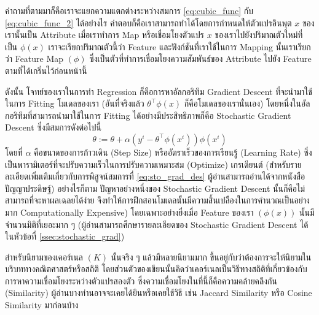 คำถามที่ตามมาก็คือเราจะแยกความแตกต่างระหว่างสมการ \eqref{eq:cubic_func} กับ \eqref{eq:cubic_func_2} ได้อย่างไร คำตอบก็คือเราสามารถทำได้โดยการกำหนดให้ตัวแปรอินพุต $x$ ของเรานั้นเป็น Attribute เมื่อเราทำการ Map หรือเชื่อมโยงตัวแปร $x$ ของเราไปยังปริมาณตัวใหม่ที่เป็น $\phi(x)$ เราจะเรียกปริมาณตัวนี้ว่า Feature และฟังก์ชันที่เราใช้ในการ Mapping นั้นเราเรียกว่า Feature Map $(\phi)$ ซึ่งเป็นตัวที่ทำการเชื่อมโยงความสัมพันธ์ของ Attribute ไปยัง Feature ตามที่ได้เกริ่นไว้ก่อนหน้านี้

ดังนั้น โจทย์ของเราในการทำ Regression ก็คือการหาอัลกอริทึม Gradient Descent ที่จะนำมาใช้ในการ Fitting โมเดลของเรา (อันที่จริงแล้ว $\theta^{\top}\phi(x)$ ก็คือโมเดลของเรานั่นเอง) โดยหนึ่งในอัลกอริทึมที่สามารถนำมาใช้ในการ Fitting ได้อย่างมีประสิทธิภาพก็คือ Stochastic Gradient Descent ซึ่งมีสมการดังต่อไปนี้
%
\begin{equation}\label{eq:sto_grad_des}
    \theta := \theta + \alpha (y^{i} - \theta^{\top}\phi(x^{i}))\phi(x^{i})
\end{equation}
%
\noindent โดยที่ $\alpha$ คือขนาดของการก้าวเดิน (Step Size) หรืออัตราเร็วของการเรียนรู้ (Learning Rate) ซึ่งเป็นพารามิเตอร์ที่จะปรับความเร็วในการปรับความเหมาะสม (Optimize) เกรเดียนต์ (สำหรับรายละเอียดเพิ่มเติมเกี่ยวกับการพิสูจน์สมการที่ \eqref{eq:sto_grad_des} ผู้อ่านสามารถอ่านได้จากหนังสือปัญญาประดิษฐ์) อย่างไรก็ตาม ปัญหาอย่างหนึ่งของ Stochastic Gradient Descent นั้นก็คือไม่สามารถที่จะหาผลเฉลยได้ง่าย จึงทำให้การฝึกสอนโมเดลนั้นมีความสิ้นเปลืองในการคำนวณเป็นอย่างมาก Computationally Expensive) โดยเฉพาะอย่างยิ่งเมื่อ Feature ของเรา $(\phi(x))$ นั้นมีจำนวนมิติที่เยอะมาก ๆ (ผู้อ่านสามารถศึกษารายละเอียดของ Stochastic Gradient Descent ได้ในหัวข้อที่ \ref{ssec:stochastic_grad})

สำหรับนิยามของเคอร์เนล $(K)$ นั้นจริง ๆ แล้วมีหลายนิยามมาก ขึ้นอยู่กับว่าต้องการจะให้นิยามในบริบททางคณิตศาสตร์หรือสถิติ โดยส่วนตัวของเขียนนั้นคิดว่าเคอร์เนลเป็นวิธีทางสถิติที่เกี่ยวข้องกับการหาความเชื่อมโยงระหว่างตัวแปรสองตัว ซึ่งความเชื่อมโยงในที่นี้ก็คือความคล้ายคลึงกัน (Similarity) ผู้อ่านบางท่านอาจจะเคยได้ยินหรือเคยใช้วิธี เช่น Jaccard Similarity หรือ Cosine Similarity มาก่อนบ้าง

